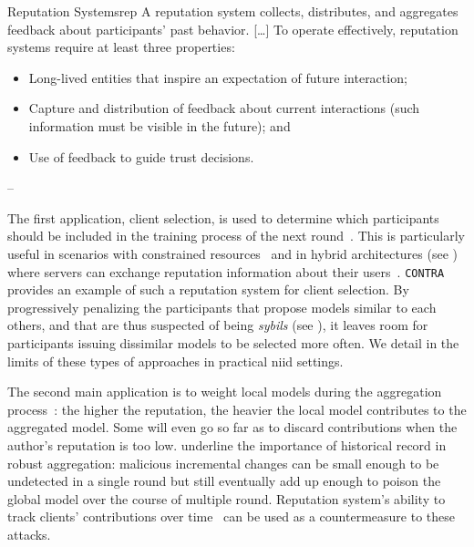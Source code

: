\begin{definitionbox}{Reputation Systems}{rep}
  A reputation system collects, distributes, and aggregates feedback about participants’ past behavior.
  [\dots]
  To operate effectively, reputation systems require at least three properties: 
  \begin{itemize}[\textbullet]
    \item Long-lived entities that inspire an expectation of future interaction;
    \item Capture and distribution of feedback about current interactions (such information must be visible in the future); and
    \item Use of feedback to guide trust decisions.
  \end{itemize}
  -- \textcite{resnick_Reputationsystems_2000}  
\end{definitionbox}

The first application, client selection, is used to determine which participants should be included in the training process of the next round~\cite{kang_ReliableFederatedLearning_2020,awan_CONTRADefendingPoisoning_2021,song_ReputationBasedFederatedLearning_2022,tan_ReputationAwareFederatedLearning_2022}.
This is particularly useful in scenarios with constrained resources~\cite{song_ReputationBasedFederatedLearning_2022} and in hybrid architectures (see ) where servers can exchange reputation information about their users~\cite{kang_ReliableFederatedLearning_2020}.
\texttt{CONTRA}~\cite{awan_CONTRADefendingPoisoning_2021} provides an example of such a reputation system for client selection.
By progressively penalizing the participants that propose models similar to each others, and that are thus suspected of being \emph{sybils} (see ), it leaves room for participants issuing dissimilar models to be selected more often. 
We detail in  the limits of these types of approaches in practical \gls{niid} settings.  

The second main application is to weight local models during the aggregation process~\cite{wang_FLAREDefendingFederated_2022,wang_ReputationenabledFederatedLearning_2021}: the higher the reputation, the heavier the local model contributes to the aggregated model.
Some will even go so far as to discard contributions when the author's reputation is too low.
\textcite{karimireddy_LearningHistoryByzantine_2021} underline the importance of historical record in robust aggregation: malicious incremental changes can be small enough to be undetected in a single round but still eventually add up enough to poison the global model over the course of multiple round.
Reputation system's ability to track clients' contributions over time~\cite{kang_ReliableFederatedLearning_2020,wang_ReputationenabledFederatedLearning_2021} can be used as a countermeasure to these attacks.


